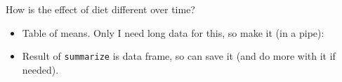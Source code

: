 \documentclass[ignorenonframetext,]{beamer}
\newenvironment{Shaded}{\begin{snugshade}}{\end{snugshade}}
\newcommand{\DataTypeTok}[1]{\textcolor[rgb]{0.13,0.29,0.53}{#1}}
\newcommand{\KeywordTok}[1]{\textcolor[rgb]{0.13,0.29,0.53}{\textbf{#1}}}
\newcommand{\NormalTok}[1]{#1}
\newcommand{\OperatorTok}[1]{\textcolor[rgb]{0.81,0.36,0.00}{\textbf{#1}}}
\newcommand{\StringTok}[1]{\textcolor[rgb]{0.31,0.60,0.02}{#1}}
\providecommand{\tightlist}{%
  \setlength{\itemsep}{0pt}\setlength{\parskip}{0pt}}
\begin{document}
\begin{frame}[fragile]{How is the effect of diet different over time?}
\protect\hypertarget{how-is-the-effect-of-diet-different-over-time}{}

\begin{itemize}
\tightlist
\item
  Table of means. Only I need long data for this, so make it (in a
  pipe):
\end{itemize}

\begin{Shaded}
\end{Shaded}

\begin{itemize}
\tightlist
\item
  Result of \texttt{summarize} is data frame, so can save it (and do
  more with it if needed).
\end{itemize}

\end{frame}
\end{document}
